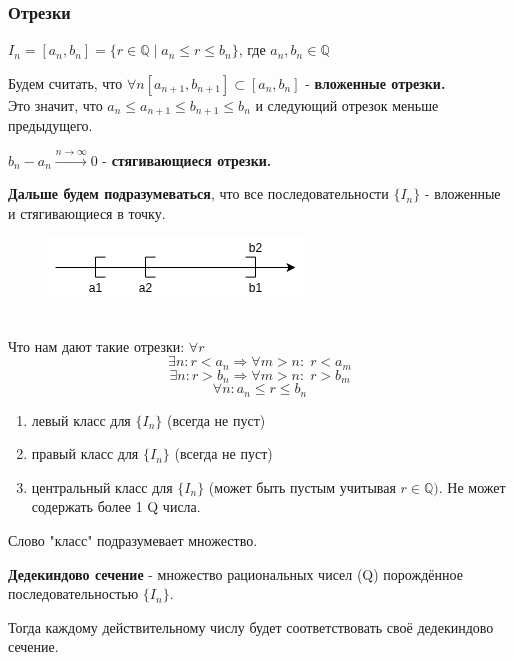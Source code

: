 \documentclass[12pt, a4paper]{article}
\newcommand{\Q}{\mathbb{Q}}
\begin{document}
\begin{centering}
\subsubsection*{Отрезки}
$I_n = [a_n, b_n] = \{ r \in \Q\; |\; a_n \leq r \leq b_n \}$, где $a_n, b_n \in \Q$
\begin{tcolorbox}
Будем считать, что $\forall n [a_{n+1}, b_{n+1}] \subset [a_n, b_n]$ - \textbf{вложенные отрезки.}\\
Это значит, что $a_n \leq a_{n+1} \leq b_{n+1} \leq b_n$ и следующий отрезок меньше предыдущего.
\end{tcolorbox}
\begin{tcolorbox}
    $b_n - a_n \xrightarrow{n\to\infty} 0$ - \textbf{стягивающиеся отрезки.}
\end{tcolorbox}
\textbf{Дальше будем подразумеваться}, что все последовательности $\{I_n\}$ - вложенные и стягивающиеся в точку.
\begin{figure}[h]
    \includegraphics[width=0.25\linewidth]{images/Дедекиндовы сечения/Смысл отрезков.png}
\end{figure}\\
Что нам дают такие отрезки: $\forall r$ \\
\begin{equation}
    \exists n: r < a_n \Rightarrow \forall m > n:\; r < a_m
\end{equation}
\begin{equation}
    \exists n: r > b_n \Rightarrow \forall m > n:\; r > b_m
\end{equation}
\begin{equation}
    \forall n: a_n \leq r \leq b_n
\end{equation}
\begin{enumerate}
    \item левый класс для $\{I_n\}$ (всегда не пуст)
    \item правый класс для $\{I_n\}$ (всегда не пуст)
    \item центральный класс для $\{I_n\}$ (может быть пустым учитывая $r \in \Q)$. Не может содержать более 1 Q числа.
\end{enumerate}
Слово "класс" подразумевает множество.
\begin{tcolorbox}
    \textbf{Дедекиндово сечение}  - множество рациональных чисел (Q) порождённое последовательностью $\{I_n\}$.
\end{tcolorbox}
Тогда каждому действительному числу будет соответствовать своё дедекиндово сечение.


\end{centering}
\end{document}
